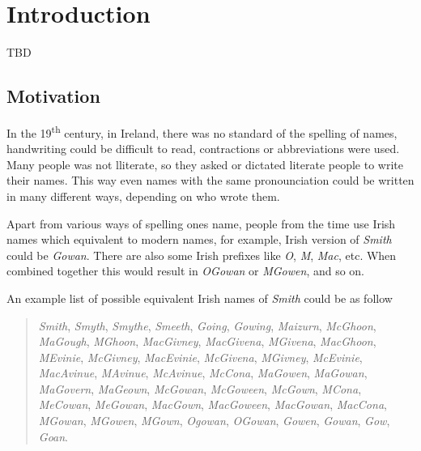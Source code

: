 \chapter{Introduction}
\label{ch:introduction}

TBD

\section{Motivation}

In the 19\textsuperscript{th} century, in Ireland, there was no standard
of the spelling of names, handwriting could be difficult to read,
contractions or abbreviations were used. Many people was not lliterate,
so they asked or dictated literate people to write their names.
This way even names with the same pronounciation could be written
in many different ways, depending on who wrote them.

Apart from various ways of spelling one\textquotesingle s name,
people from the time use Irish names which equivalent to modern names,
for example, Irish version of \emph{Smith} could be \emph{Gowan}.
There are also some Irish prefixes like \emph{O\textquotesingle}, \emph{M\textquotesingle}, \emph{Mac},
etc. When combined together this would result in \emph{O\textquotesingle Gowan} or
\emph{M\textquotesingle Gowen}, and so on.

An example list of possible equivalent Irish names of \emph{Smith} could be as follow

\begin{quotation} \noindent
\emph{Smith},
\emph{Smyth},
\emph{Smythe},
\emph{Smeeth},
\emph{Going},
\emph{Gowing},
\emph{Maizurn},
\emph{McGhoon},
\emph{MaGough},
\emph{M\textquotesingle Ghoon},
\emph{MacGivney},
\emph{MacGivena},
\emph{M\textquotesingle Givena},
\emph{MacGhoon},
\emph{M\textquotesingle Evinie},
\emph{McGivney},
\emph{MacEvinie},
\emph{McGivena},
\emph{M\textquotesingle Givney},
\emph{McEvinie},
\emph{MacAvinue},
\emph{M\textquotesingle Avinue},
\emph{McAvinue},
\emph{McCona},
\emph{MaGowen},
\emph{MaGowan},
\emph{MaGovern},
\emph{MaGeown},
\emph{McGowan},
\emph{McGoween},
\emph{McGown},
\emph{M\textquotesingle Cona},
\emph{MeCowan},
\emph{MeGowan},
\emph{MacGown},
\emph{MacGoween},
\emph{MacGowan},
\emph{MacCona},
\emph{M\textquotesingle Gowan},
\emph{M\textquotesingle Gowen},
\emph{M\textquotesingle Gown},
\emph{Ogowan},
\emph{O\textquotesingle Gowan},
\emph{Gowen},
\emph{Gowan},
\emph{Gow},
\emph{Goan}.
\end{quotation}

